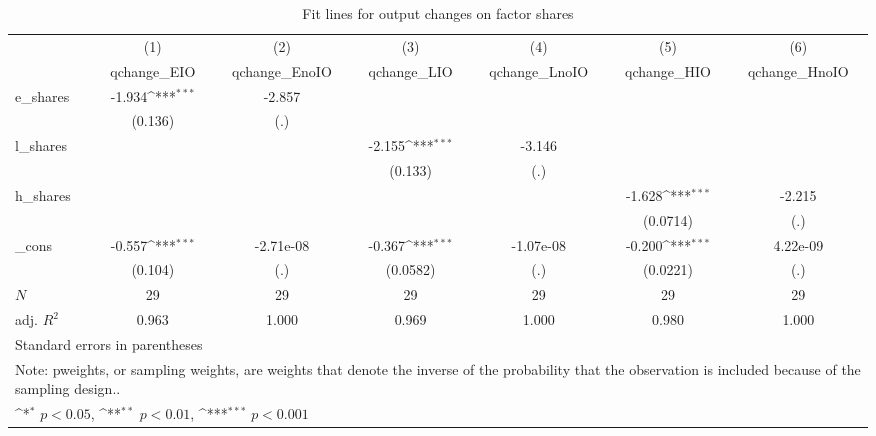 \begin{table}[htbp]\centering
\def\sym#1{\ifmmode^{#1}\else\(^{#1}\)\fi}
\caption{Fit lines for output changes on factor shares}
\begin{tabular}{l*{6}{c}}
\toprule
            &\multicolumn{1}{c}{(1)}&\multicolumn{1}{c}{(2)}&\multicolumn{1}{c}{(3)}&\multicolumn{1}{c}{(4)}&\multicolumn{1}{c}{(5)}&\multicolumn{1}{c}{(6)}\\
            &\multicolumn{1}{c}{qchange\_EIO}&\multicolumn{1}{c}{qchange\_EnoIO}&\multicolumn{1}{c}{qchange\_LIO}&\multicolumn{1}{c}{qchange\_LnoIO}&\multicolumn{1}{c}{qchange\_HIO}&\multicolumn{1}{c}{qchange\_HnoIO}\\
\midrule
e\_shares    &      -1.934\sym{***}&      -2.857         &                     &                     &                     &                     \\
            &     (0.136)         &         (.)         &                     &                     &                     &                     \\
\addlinespace
l\_shares    &                     &                     &      -2.155\sym{***}&      -3.146         &                     &                     \\
            &                     &                     &     (0.133)         &         (.)         &                     &                     \\
\addlinespace
h\_shares    &                     &                     &                     &                     &      -1.628\sym{***}&      -2.215         \\
            &                     &                     &                     &                     &    (0.0714)         &         (.)         \\
\addlinespace
\_cons      &      -0.557\sym{***}&   -2.71e-08         &      -0.367\sym{***}&   -1.07e-08         &      -0.200\sym{***}&    4.22e-09         \\
            &     (0.104)         &         (.)         &    (0.0582)         &         (.)         &    (0.0221)         &         (.)         \\
\midrule
\(N\)       &          29         &          29         &          29         &          29         &          29         &          29         \\
adj. \(R^{2}\)&       0.963         &       1.000         &       0.969         &       1.000         &       0.980         &       1.000         \\
\bottomrule
\multicolumn{7}{l}{\footnotesize Standard errors in parentheses}\\
\multicolumn{7}{l}{\footnotesize Note: pweights, or sampling weights, are weights that denote the inverse of the probability that the observation is included because of the sampling design..}\\
\multicolumn{7}{l}{\footnotesize \sym{*} \(p<0.05\), \sym{**} \(p<0.01\), \sym{***} \(p<0.001\)}\\
\end{tabular}
\end{table}
